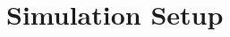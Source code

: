 \documentclass[../zhang_thesis.tex]{subfiles}
\begin{document}
\section{Simulation Setup}




\end{document}
